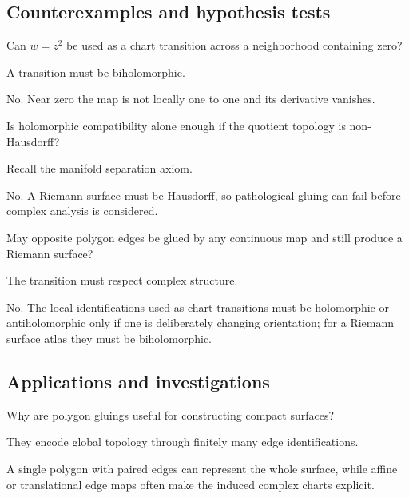 \subsection*{Counterexamples and hypothesis tests}

\begin{exercise}\label{exr:iv25-expand-10}
Can \(w=z^2\) be used as a chart transition across a neighborhood containing zero?
\end{exercise}
\begin{hint}
A transition must be biholomorphic.
\end{hint}
\begin{solution}
No. Near zero the map is not locally one to one and its derivative vanishes.
\end{solution}

\begin{exercise}\label{exr:iv25-expand-11}
Is holomorphic compatibility alone enough if the quotient topology is non-Hausdorff?
\end{exercise}
\begin{hint}
Recall the manifold separation axiom.
\end{hint}
\begin{solution}
No. A Riemann surface must be Hausdorff, so pathological gluing can fail before complex analysis is considered.
\end{solution}

\begin{exercise}\label{exr:iv25-expand-12}
May opposite polygon edges be glued by any continuous map and still produce a Riemann surface?
\end{exercise}
\begin{hint}
The transition must respect complex structure.
\end{hint}
\begin{solution}
No. The local identifications used as chart transitions must be holomorphic or antiholomorphic only if one is deliberately changing orientation; for a Riemann surface atlas they must be biholomorphic.
\end{solution}

\subsection*{Applications and investigations}

\begin{exercise}\label{exr:iv25-expand-13}
Why are polygon gluings useful for constructing compact surfaces?
\end{exercise}
\begin{hint}
They encode global topology through finitely many edge identifications.
\end{hint}
\begin{solution}
A single polygon with paired edges can represent the whole surface, while affine or translational edge maps often make the induced complex charts explicit.
\end{solution}

